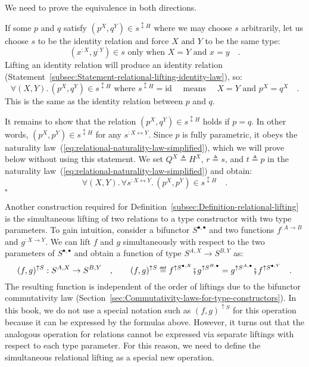 We need to prove the equivalence in both directions.

If some $p$ and $q$ satisfy $(p^{X},q^{Y})\in s^{\updownarrow H}$
where we may choose $s$ arbitrarily, let us choose $s$ to be the
identity relation and force $X$ and $Y$ to be the same type:
\[
(x^{:X},y^{:Y})\in s\text{ only when }X=Y\text{ and }x=y\quad.
\]
Lifting an identity relation will produce an identity relation (Statement~\ref{subsec:Statement-relational-lifting-identity-law}),
so:
\[
\forall(X,Y).\,(p^{X},q^{Y})\in s^{\updownarrow H}\text{ where }s^{\updownarrow H}=\text{id}\quad\text{ means }\quad X=Y\text{ and }p^{X}=q^{X}\quad.
\]
This is the same as the identity relation between $p$ and $q$.

It remains to show that the relation $(p^{X},q^{Y})\in s^{\updownarrow H}$
holds if $p=q$. In other words, $(p^{X},p^{Y})\in s^{\updownarrow H}$
for any $s^{:X\leftrightarrow Y}$. Since $p$ is fully parametric,
it obeys the naturality law~(\ref{eq:relational-naturality-law-simplified}),
which we will prove below without using this statement. We set $Q^{X}\triangleq H^{X}$,
$r\triangleq s$, and $t\triangleq p$ in the naturality law~(\ref{eq:relational-naturality-law-simplified})
and obtain:
\[
\forall(X,Y).\,\forall s^{:X\leftrightarrow Y}.\,(p^{X},p^{Y})\in s^{\updownarrow H}\quad.
\]
$\square$

Another construction required for Definition~\ref{subsec:Definition-relational-lifting}
is the simultaneous lifting of two relations to a type constructor
with two type parameters. To gain intuition, consider a bifunctor
$S^{\bullet,\bullet}$ and two functions $f^{:A\rightarrow B}$ and
$g^{:X\rightarrow Y}$. We can lift $f$ and $g$ simultaneously with
respect to the two parameters of $S^{\bullet,\bullet}$ and obtain
a function of type $S^{A,X}\rightarrow S^{B,Y}$ as:
\[
(f,g)^{\uparrow S}:S^{A,X}\rightarrow S^{B,Y}\quad,\quad\quad(f,g)^{\uparrow S}\triangleq f^{\uparrow S^{\bullet,X}}\bef g^{\uparrow S^{B,\bullet}}=g^{\uparrow S^{A,\bullet}}\bef f^{\uparrow S^{\bullet,Y}}\quad.
\]
The resulting function is independent of the order of liftings due
to the bifunctor commutativity law
(Section~\ref{sec:Commutativity-laws-for-type-constructors}). In
this book, we do not use a special notation such as $(f,g)^{\uparrow S}$
for this operation because it can be expressed by the formulas above.
However, it turns out that the analogous operation for relations cannot
be expressed via separate liftings with respect to each type parameter.
For this reason, we need to define the simultaneous relational lifting
as a special new operation.

